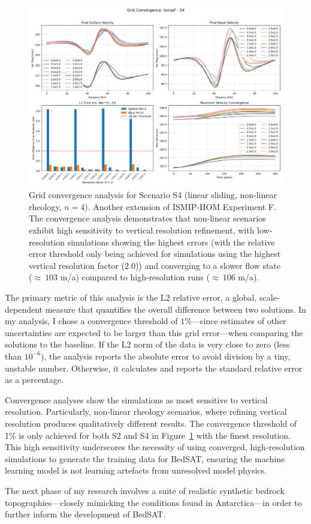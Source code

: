 \begin{figure}[H]
    \includegraphics[scale=0.40]{figures/IsmipF_S4_convergence_summary.png}
    \caption{Grid convergence analysis for Scenario S4 (linear sliding, non-linear rheology, $n=4$). Another extension of ISMIP-HOM Experiment F. The convergence analysis demonstrates that non-linear scenarios exhibit high sensitivity to vertical resolution refinement, with low-resolution simulations showing the highest errors (with the relative error threshold only being achieved for simulations using the highest vertical resolution factor (2.0)) and converging to a slower flow state ($\approx~103$ m/a) compared to high-resolution runs ($\approx~106$ m/a).}
    \label{fig:grid_conv_S4}
\end{figure}
The primary metric of this analysis is the L2 relative error, a global, scale-dependent measure that quantifies the overall difference between two solutions. In my analysis, I chose a convergence threshold of $1\%$—since estimates of other uncertainties are expected to be larger than this grid error—when comparing the solutions to the baseline. If the L2 norm of the data is very close to zero (less than $10^{-6}$), the analysis reports the absolute error to avoid division by a tiny, unstable number. Otherwise, it calculates and reports the standard relative error as a percentage.

Convergence analyses show the simulations as most sensitive to vertical resolution. Particularly, non-linear rheology scenarios, where refining vertical resolution produces qualitatively different results. The convergence threshold of 1\% is only achieved for both S2 and S4 in Figure~\ref{fig:grid_conv_S4} with the finest resolution. This high sensitivity underscores the necessity of using converged, high-resolution simulations to generate the training data for BedSAT, ensuring the machine learning model is not learning artefacts from unresolved model physics.

The next phase of my research involves a suite of realistic synthetic bedrock topographies—closely mimicking the conditions found in Antarctica—in order to further inform the development of BedSAT.